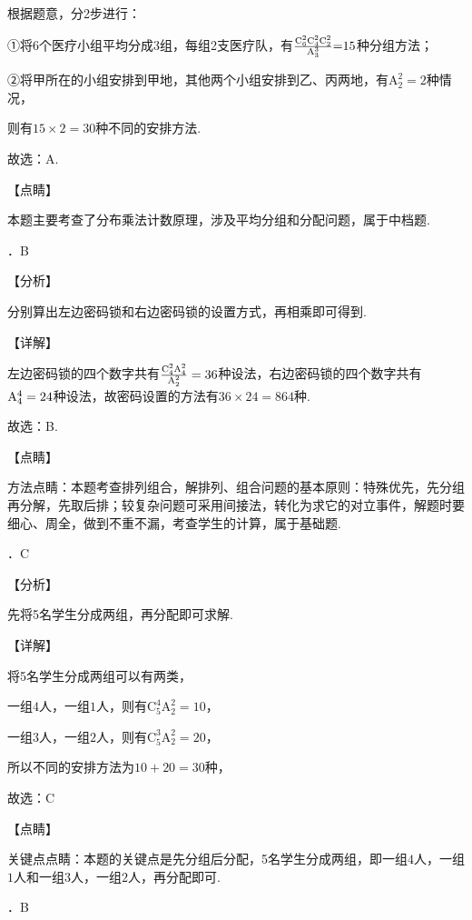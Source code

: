 \noindent 根据题意，分2步进行：

\noindent ①将6个医疗小组平均分成3组，每组2支医疗队，有$\frac{\mathrm C_{6}^{2} \mathrm C_{4}^{2} \mathrm C_{2}^{2} }{\mathrm A_{3}^{3} } {\rm =}15$种分组方法；

\noindent ②将甲所在的小组安排到甲地，其他两个小组安排到乙、丙两地，有$\mathrm A_{2}^{2} =2$种情况，

\noindent 则有$15\times 2=30$种不同的安排方法.

\noindent 故选：A.

\noindent 【点睛】

\noindent 本题主要考查了分布乘法计数原理，涉及平均分组和分配问题，属于中档题.

．B

\noindent 【分析】

\noindent 分别算出左边密码锁和右边密码锁的设置方式，再相乘即可得到.

\noindent 【详解】

\noindent 左边密码锁的四个数字共有$\frac{{\rm C}_{4}^{2} {\rm A}_{4}^{2} }{{\rm A}_{2}^{2} } =36$种设法，右边密码锁的四个数字共有${\rm A}_{4}^{4} =24$种设法，故密码设置的方法有$36\times 24=864$种.

\noindent 故选：B.

\noindent 【点睛】

\noindent 方法点睛：本题考查排列组合，解排列、组合问题的基本原则：特殊优先，先分组再分解，先取后排；较复杂问题可采用间接法，转化为求它的对立事件，解题时要细心、周全，做到不重不漏，考查学生的计算，属于基础题.

．C

\noindent 【分析】

\noindent 先将5名学生分成两组，再分配即可求解.

\noindent 【详解】

\noindent 将5名学生分成两组可以有两类，

\noindent 一组$4$人，一组$1$人，则有$\mathrm C_{5}^{4} \mathrm A_{2}^{2} =10$，

\noindent 一组$3$人，一组$2$人，则有$\mathrm C_{5}^{3} \mathrm A_{2}^{2} =20$，

\noindent 所以不同的安排方法为$10+20=30$种，

\noindent 故选：C

\noindent 【点睛】

\noindent 关键点点睛：本题的关键点是先分组后分配，5名学生分成两组，即一组$4$人，一组$1$人和一组$3$人，一组$2$人，再分配即可.

．B

